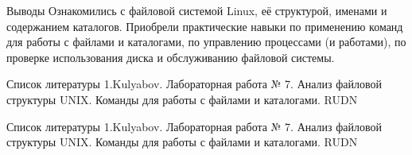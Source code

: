 \documentclass[
  ignorenonframetext,
  aspectratio=169,
]{beamer}
\newlength{\cslhangindent}
\newenvironment{CSLReferences}[2] %
 {\begin{list}{}{%
  \setlength{\itemindent}{0pt}
  \setlength{\leftmargin}{0pt}
  \setlength{\parsep}{0pt}
  \ifodd #1
   \setlength{\leftmargin}{\cslhangindent}
   \setlength{\itemindent}{-1\cslhangindent}
  \fi
  \setlength{\itemsep}{#2\baselineskip}}}
 {\end{list}}
\begin{document}
\begin{frame}{Выводы}
\label{ux432ux44bux432ux43eux434ux44b}
Ознакомились с файловой системой Linux, её структурой, именами и
содержанием каталогов. Приобрели практические навыки по применению
команд для работы с файлами и каталогами, по управлению процессами (и
работами), по проверке использования диска и обслуживанию файловой
системы.
\end{frame}

\begin{frame}{Список литературы}
\label{ux441ux43fux438ux441ux43eux43a-ux43bux438ux442ux435ux440ux430ux442ux443ux440ux44b}
1.Kulyabov. Лабораторная работа № 7. Анализ файловой структуры UNIX.
Команды для работы с файлами и каталогами. RUDN
\end{frame}

\begin{frame}{Список литературы}
\label{ux441ux43fux438ux441ux43eux43a-ux43bux438ux442ux435ux440ux430ux442ux443ux440ux44b-1}
1.Kulyabov. Лабораторная работа № 7. Анализ файловой структуры UNIX.
Команды для работы с файлами и каталогами. RUDN

\label{refs}
\begin{CSLReferences}{0}{1}
\end{CSLReferences}
\end{frame}
\end{document}
